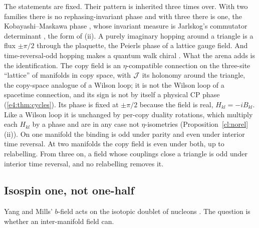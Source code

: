 The statements are fixed. Their pattern is inherited three times over. With two families there is no rephasing-invariant phase and with three
there is one, the Kobayashi--Maskawa phase \cite{KobayashiMaskawa73}, whose invariant measure is Jarlskog's commutator determinant
\cite{Jarlskog85}, the form of (ii). A purely imaginary hopping around a triangle is a flux $\pm\pi/2$ through the plaquette, the Peierls phase
\cite{Peierls33} of a lattice gauge field. And time-reversal-odd hopping makes a quantum walk chiral \cite{Zimboras13}. What the arena adds is
the identification. The copy field is an $\eta$-compatible connection on the three-site ``lattice'' of manifolds in copy space, with $\mathcal J $ its
holonomy around the triangle, the copy-space analogue of a Wilson loop; it is not the Wilson loop of a spacetime connection, and its sign is not
by itself a physical CP phase (\cref{e4:thm:cycles}). Its phase is fixed at $\pm\pi/2$ because the field is real, $H_{kl}=-iB_{kl}$. Like a Wilson loop it is unchanged by per-copy duality rotations, which multiply each $H_{kl}$ by a phase and are in any case not $\eta$-isometries
(Proposition~\ref{cl:norel}(ii)). On one manifold the binding is odd under parity and even under interior time reversal. At two manifolds the
copy field is even under both, up to relabelling. From three on, a field whose couplings close a triangle is odd under interior time reversal,
and no relabelling removes it.

\subsection{Isospin one, not one-half}
\label{d7:sec:isospin}

Yang and Mills' $b$-field acts on the isotopic doublet of nucleons \cite{YangMills54}. The question is whether an inter-manifold field can.

